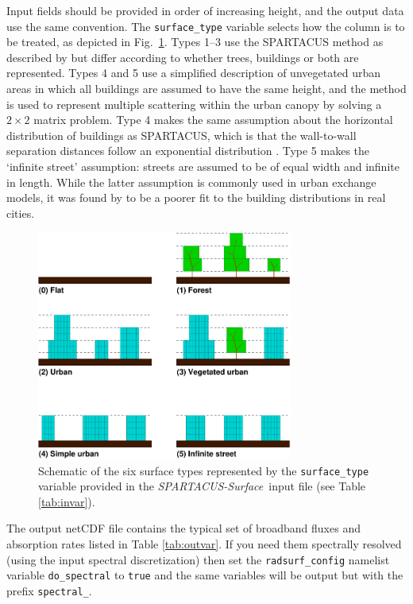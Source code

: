 \documentclass[a4,oneside]{article}
\def\codesize{\small}
\def\spsurf{\emph{SPARTACUS-Surface}}
\def\code#1{{\codesize\texttt{#1}}}
\begin{document}
Input fields should be provided in order of increasing height, and the
output data use the same convention. The \code{surface\_type} variable
selects how the column is to be treated, as depicted in
Fig.\ \ref{fig:type_schematic}. Types 1--3 use the SPARTACUS method as
described by \cite{Hogan2019b} but differ according to whether trees,
buildings or both are represented. Types 4 and 5 use a simplified
description of unvegetated urban areas in which all buildings are
assumed to have the same height, and the \cite{Harman+2004} method is
used to represent multiple scattering within the urban canopy by
solving a $2\times2$ matrix problem.  Type 4 makes the same assumption
about the horizontal distribution of buildings as SPARTACUS, which is
that the wall-to-wall separation distances follow an exponential
distribution \citep{Hogan2019a}. Type 5 makes the `infinite street'
assumption: streets are assumed to be of equal width and infinite in
length. While the latter assumption is commonly used in urban exchange
models, it was found by \cite{Hogan2019a} to be a poorer fit to the
building distributions in real cities.

\begin{figure}[tb!]
  \centerline{\includegraphics[width=0.75\textwidth]{surface_type_schematic.pdf}}
  \caption{\label{fig:type_schematic}Schematic of the six surface
    types represented by the \code{surface\_type} variable provided in
    the \spsurf\ input file (see Table \ref{tab:invar}).}
\end{figure}

The output netCDF file contains the typical set of broadband fluxes
and absorption rates listed in Table \ref{tab:outvar}. If you need
them spectrally resolved (using the input spectral discretization)
then set the \code{radsurf\_config} namelist variable
\code{do\_spectral} to \code{true} and the same variables will be
output but with the prefix \code{spectral\_}.
\end{document}
